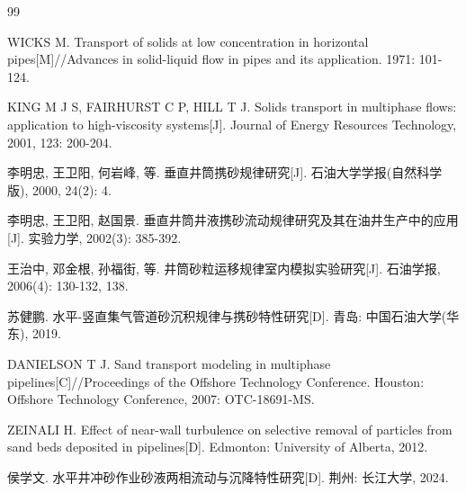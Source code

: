 \begin{thebibliography}{99}
{} %

WICKS M. Transport of solids at low concentration in horizontal pipes[M]//Advances in solid-liquid flow in pipes and its application. 1971: 101-124.

KING M J S, FAIRHURST C P, HILL T J. Solids transport in multiphase flows: application to high-viscosity systems[J]. Journal of Energy Resources Technology, 2001, 123: 200-204.

李明忠, 王卫阳, 何岩峰, 等. 垂直井筒携砂规律研究[J]. 石油大学学报(自然科学版), 2000, 24(2): 4.

李明忠, 王卫阳, 赵国景. 垂直井筒井液携砂流动规律研究及其在油井生产中的应用[J]. 实验力学, 2002(3): 385-392.

王治中, 邓金根, 孙福街, 等. 井筒砂粒运移规律室内模拟实验研究[J]. 石油学报, 2006(4): 130-132, 138.

苏健鹏. 水平-竖直集气管道砂沉积规律与携砂特性研究[D]. 青岛: 中国石油大学(华东), 2019.

DANIELSON T J. Sand transport modeling in multiphase pipelines[C]//Proceedings of the Offshore Technology Conference. Houston: Offshore Technology Conference, 2007: OTC-18691-MS.

ZEINALI H. Effect of near-wall turbulence on selective removal of particles from sand beds deposited in pipelines[D]. Edmonton: University of Alberta, 2012.

侯学文. 水平井冲砂作业砂液两相流动与沉降特性研究[D]. 荆州: 长江大学, 2024.


\end{thebibliography}

